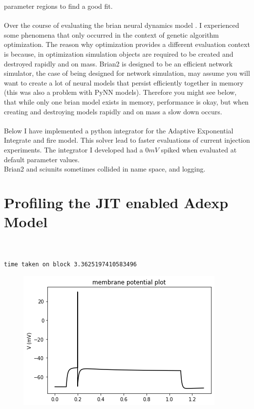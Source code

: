 parameter regions to find a good fit.\\
\\
Over  the course of evaluating the brian neural dynamics model \cite{gerstner2014neuronal}. I experienced some phenomena that only occurred in the context of genetic algorithm optimization. The reason why optimization provides a different evaluation context is because, in optimization simulation objects are required to be created and destroyed rapidly and on mass. Brian2 is designed to be an efficient network simulator, the case of being designed for network simulation, may assume you will want to create a lot of neural models that persist efficiently together in memory (this was also a problem with PyNN models). Therefore you might see below, that while only one brian model exists in memory, performance is okay, but when creating and destroying models rapidly and on mass a slow down occurs.\\
\\
Below I have implemented a python integrator for the Adaptive
Exponential Integrate and fire model. This solver lead to faster
evaluations of current injection experiments. The integrator I developed
had a $0mV$ spiked when evaluated at default
parameter values.\\


Brian2 and sciunits sometimes collided in name space, and logging.

\section{Profiling the JIT enabled Adexp Model}
\begin{verbatim}
    

time taken on block 3.3625197410583496

\end{verbatim}

\begin{figure}    
\begin{center}
\includegraphics[width=1.1\linewidth]{figures/backend_check_files/backend_check_6_2.png}
\caption{}

\end{center}
\end{figure}

